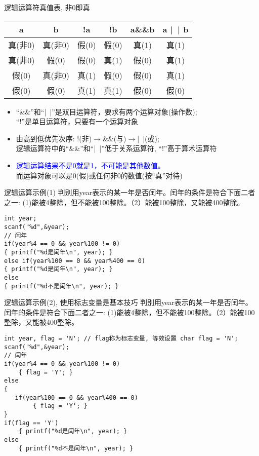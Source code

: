 \begin{frame}{逻辑运算符真值表, 非0即真}
\centering
\begin{tabular}{|c|c||c|c|c|c|}
\hline 
a       & b      & !a    & !b    & a\&\&b & a |~| b \\ 
\hline 
真(非0) & 真(非0) & 假(0) & 假(0) & 真(1)  & 真(1) \\ 
\hline
真(非0) & 假(0)   & 假(0) & 真(1) & 假(0)  & 真(1) \\ 
\hline 
假(0)   & 真(非0) & 真(1) & 假(0) & 假(0)  & 真(1) \\ 
\hline 
假(0)   & 假(0)   & 真(1) & 真(1) & 假(0)  & 假(0) \\ 
\hline  
\end{tabular} 
\begin{itemize}
	\item ``\&\&''和``|~|''是双目运算符，要求有两个运算对象(操作数);\\ ``!''是单目运算符，只要有一个运算对象
	\item 由高到低优先次序: !(非)$\to$\&\&(与)$\to$|~|(或);\\
          逻辑运算符中的``\&\&''和``|~|''低于关系运算符, ``!''高于算术运算符
	\item \textcolor{blue}{逻辑运算结果不是0就是1，不可能是其他数值。}\\
	      而运算对象可以是0(假)或任何非0的数值(按``真''对待)
\end{itemize}
\end{frame}

\begin{frame}{逻辑运算示例(1)}
判别用year表示的某一年是否闰年。闰年的条件是符合下面二者之一: (1)能被4整除，但不能被100整除。（2）能被100整除，又能被400整除。
\begin{lstlisting}
int year;
scanf("%d",&year);
// 闰年
if(year%4 == 0 && year%100 != 0)
{ printf("%d是闰年\n", year); }
else if(year%100 == 0 && year%400 == 0)
{ printf("%d是闰年\n", year); }
else
{ printf("%d不是闰年\n", year); }
\end{lstlisting}
\end{frame}

\begin{frame}{逻辑运算示例(2), 使用标志变量是基本技巧}
判别用year表示的某一年是否闰年。闰年的条件是符合下面二者之一: (1)能被4整除，但不能被100整除。（2）能被100整除，又能被400整除。
\begin{lstlisting}
int year, flag = 'N'; // flag称为标志变量, 等效设置 char flag = 'N'; 
scanf("%d",&year);
// 闰年
if(year%4 == 0 && year%100 != 0)
	{ flag = 'Y'; }
else
{ 
   if(year%100 == 0 && year%400 == 0)
   		{ flag = 'Y'; }
}
if(flag == 'Y') 
	{ printf("%d是闰年\n", year); }
else
	{ printf("%d不是闰年\n", year); }
\end{lstlisting}
\end{frame}


